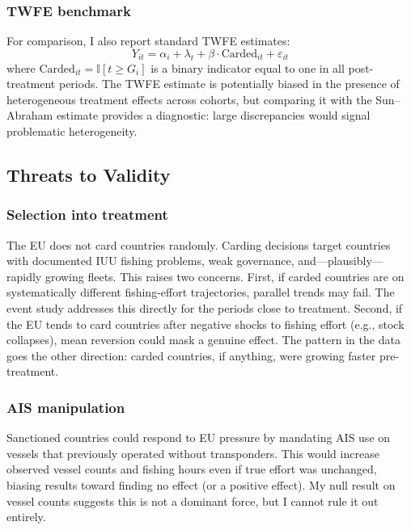 \documentclass[12pt]{article}
\newcommand{\ind}{\mathbb{I}}
\begin{document}
\subsubsection*{TWFE benchmark} For comparison, I also report standard TWFE estimates:
\begin{equation}
Y_{it} = \alpha_i + \lambda_t + \beta \cdot \text{Carded}_{it} + \varepsilon_{it}
\label{eq:twfe}
\end{equation}
where $\text{Carded}_{it} = \ind[t \geq G_i]$ is a binary indicator equal to one in all post-treatment periods. The TWFE estimate is potentially biased in the presence of heterogeneous treatment effects across cohorts, but comparing it with the Sun--Abraham estimate provides a diagnostic: large discrepancies would signal problematic heterogeneity.

\subsection{Threats to Validity}

\subsubsection*{Selection into treatment} The EU does not card countries randomly. Carding decisions target countries with documented IUU fishing problems, weak governance, and---plausibly---rapidly growing fleets. This raises two concerns. First, if carded countries are on systematically different fishing-effort trajectories, parallel trends may fail. The event study addresses this directly for the periods close to treatment. Second, if the EU tends to card countries after negative shocks to fishing effort (e.g., stock collapses), mean reversion could mask a genuine effect. The pattern in the data goes the other direction: carded countries, if anything, were growing faster pre-treatment.

\subsubsection*{AIS manipulation} Sanctioned countries could respond to EU pressure by mandating AIS use on vessels that previously operated without transponders. This would increase observed vessel counts and fishing hours even if true effort was unchanged, biasing results toward finding no effect (or a positive effect). My null result on vessel counts suggests this is not a dominant force, but I cannot rule it out entirely.
\end{document}
